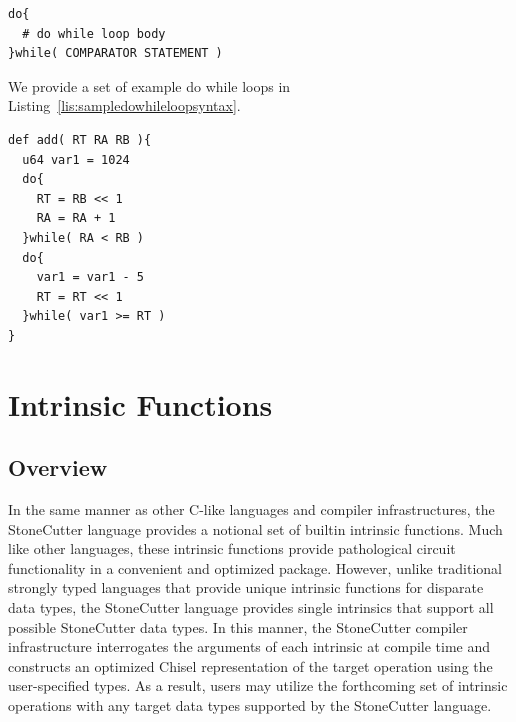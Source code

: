 \documentclass{article}
\begin{document}
\vspace{0.125in}
\begin{lstlisting}[frame=single,style=base,caption={Do While Loop Syntax},captionpos=b,label={lis:dowhileloopsyntax}]
do{
  # do while loop body
}while( COMPARATOR STATEMENT )
\end{lstlisting}

We provide a set of example do while loops in Listing~\ref{lis:sampledowhileloopsyntax}.

\vspace{0.125in}
\begin{lstlisting}[frame=single,style=base,caption={Sample Do While Loop Syntax},captionpos=b,label={lis:sampledowhileloopsyntax}]
def add( RT RA RB ){
  u64 var1 = 1024
  do{
    RT = RB << 1
    RA = RA + 1
  }while( RA < RB )  
  do{
    var1 = var1 - 5
    RT = RT << 1
  }while( var1 >= RT )
}
\end{lstlisting}

\clearpage
\section{Intrinsic Functions}
\label{sec:IntrinsicFunctions}

\subsection{Overview}
\label{sec:IntrinsicOverview}

In the same manner as other C-like languages and compiler infrastructures, 
the StoneCutter language provides a notional set of builtin intrinsic functions.  
Much like other languages, these intrinsic functions provide pathological 
circuit functionality in a convenient and optimized package.  However, 
unlike traditional strongly typed languages that provide unique intrinsic 
functions for disparate data types, the StoneCutter language provides 
single intrinsics that support all possible StoneCutter data types.  In this manner, 
the StoneCutter compiler infrastructure interrogates the arguments of each intrinsic 
at compile time and constructs an optimized Chisel representation of the target 
operation using the user-specified types.  As a result, users may utilize the forthcoming 
set of intrinsic operations with any target data types supported by the StoneCutter language.  
\end{document}
